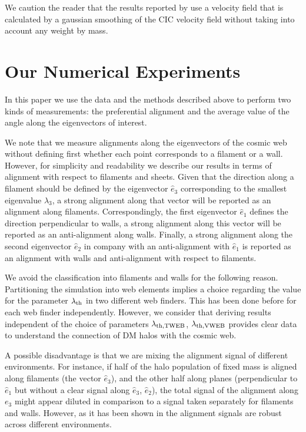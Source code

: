 \documentclass[useAMS,usenatbib]{mn2e}
\begin{document}
We caution the reader that the results reported by
\citep{Vweb, Libeskind2013} use a velocity field that is
calculated by a gaussian smoothing of the CIC velocity field without
taking into account any weight by mass.   


\section{Our Numerical Experiments}
\label{sec:experiments}

In this paper we use the data and the methods described above to
perform two kinds of measurements: the preferential alignment and the
average value of the angle along the eigenvectors of interest.

We note that we measure alignments along the eigenvectors of the
cosmic web without defining first whether each point corresponds to a
filament or a wall. However, for simplicity and readability we describe
our results in terms of alignment with respect to filaments and
sheets. Given that the direction along a filament should be defined by the
eigenvector $\hat{e}_3$ corresponding to the smallest eigenvalue $\lambda_3$, a
strong alignment along that vector will be reported as an alignment
along filaments. Correspondingly, the first eigenvector $\hat{e}_{1}$
defines the direction perpendicular to walls, a strong alignment along
this vector will be reported as an anti-alignment along
walls. Finally, a strong alignment along the second eigenvector
$\hat{e}_2$ in company with an anti-alignment with $\hat{e}_1$ is
reported as an alignment with walls and anti-alignment with respect to
filaments. 


We avoid the classification into filaments and walls for the following
reason. Partitioning the simulation into web elements implies
a choice regarding the value for the parameter $\lambda_{\rm th}$ in
two different web finders. This has been done before for each web
finder independently. However, we consider that deriving results
independent of the choice of parameters $\lambda_{\rm th,TWEB}$,
$\lambda_{\rm th, VWEB}$ provides clear data to understand the
connection of DM halos with the cosmic web.  

A possible disadvantage is that we are mixing the alignment signal
of different environments. For instance, if half of the halo population of
fixed mass is aligned along filaments (the vector $\hat{e}_3$), and the
other half along planes (perpendicular to $\hat{e}_1$ but without a
clear signal along $\hat{e}_3$, $\hat{e}_2$), the total signal of the
alignment along $e_3$ might appear diluted in comparison to a signal
taken separately for filaments and walls. However, as it has been
shown in \cite{Libeskind2013} the alignment signals are robust across
different environments. 
\end{document}
